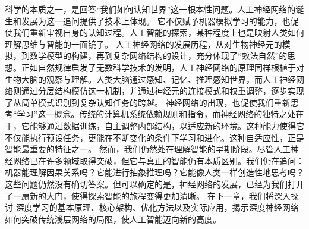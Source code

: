 科学的本质之一，是回答“我们如何认知世界”这一根本性问题。人工神经网络的诞生和发展为这一追问提供了技术上体现。
它不仅赋予机器模拟学习的能力，也促使我们重新审视自身的认知过程。人工智能的探索，某种程度上也是映射人类如何理解思维与智能的一面镜子。
人工神经网络的发展历程，从对生物神经元的模拟，到数学模型的构建，再到复杂网络结构的设计，充分体现了“效法自然”的思想。正如自然规律启发了无数科学技术的发明，人工神经网络的原理同样根植于对生物大脑的观察与理解。人类大脑通过感知、记忆、推理感知世界，而人工神经网络则通过分层结构模仿这一机制，并通过神经元的连接模式和权重调整，逐步实现了从简单模式识别到复杂认知任务的跨越。
神经网络的出现，也促使我们重新思考“学习”这一概念。传统的计算机系统依赖规则和指令，而神经网络的独特之处在于，它能够通过数据训练，自主调整内部结构，以适应新的环境。这种能力使得它不仅能执行预设任务，更能在不断变化的条件下学习和进化。这种自适应性，正是智能最重要的特征之一。
然而，我们仍然处在理解智能的早期阶段。尽管人工神经网络已在许多领域取得突破，但它与真正的智能仍有本质区别。我们仍在追问：机器能理解因果关系吗？它能进行抽象推理吗？它能像人类一样创造性地思考吗？ 这些问题仍然没有确切答案。但可以确定的是，神经网络的发展，已经为我们打开了一扇新的大门，使得探索智能的旅程变得更加清晰。
在下一章，我们将深入探讨 深度学习的基本原理、核心架构、优化方法以及实际应用，揭示深度神经网络如何突破传统浅层网络的局限，使人工智能迈向新的高度。
\nocite{*}
\printbibliography[heading=bibintoc, title=\ebibname]
\newpage
